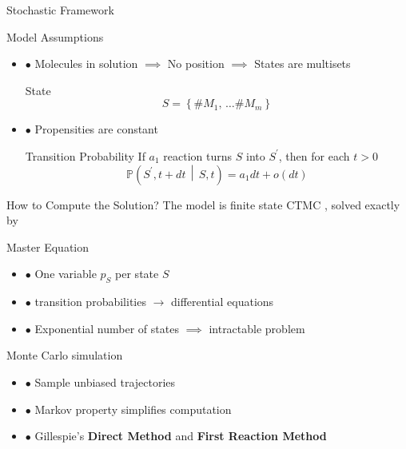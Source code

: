 \documentclass{beamer}
\begin{document}
\begin{frame}{Stochastic Framework}
  \begin{block}{Model Assumptions}
    \begin{itemize}
    \item $\bullet$ Molecules in solution $\implies$ No position $\implies$ States are multisets
      \begin{center}
        \begin{minipage}{.7 \textwidth}
          \begin{block}{State}
            $$ S = \left\{ \#M_1, \, \dots \#M_m \right\} $$
          \end{block}
        \end{minipage}
      \end{center}
      \vspace{1.pt}
      \pause
    \item $\bullet$ Propensities are constant 
      \begin{center} 
       \begin{minipage}{.7 \textwidth}
          \begin{block}{Transition Probability}
            If $a_1$ reaction turns $S$ into $S^\prime$, then for each $t > 0$
            $$ \mathbb{P}\left(S^\prime, t + dt \,  \middle| \, S, t \right) = a_1dt + o(dt) $$
          \end{block}
        \end{minipage}
      \end{center}   
    \end{itemize}
  \end{block}
\end{frame}

\begin{frame}{How to Compute the Solution?}
  The model is finite state CTMC , solved exactly by
  \begin{block}{Master Equation}
    \begin{itemize}
    \item $\bullet$ One variable $p_S$ per state $S$
    \item $\bullet$ transition probabilities $\longrightarrow$ differential equations 
    \item $\bullet$ Exponential number of states $\implies$ intractable problem
    \end{itemize}
  \end{block}
  \pause
  \begin{block}{Monte Carlo simulation}
    \begin{itemize}
    \item $\bullet$ Sample unbiased trajectories
    \item $\bullet$ Markov property simplifies computation
    \item $\bullet$ Gillespie's \textbf{Direct Method} and \textbf{First Reaction Method} 
    \end{itemize}
  \end{block}
\end{frame}
\end{document}
